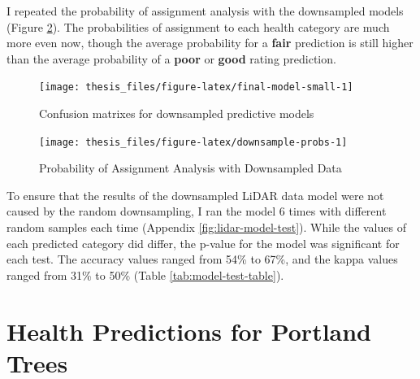 \documentclass[12pt,twoside]{reedthesis}
\begin{document}
I repeated the probability of assignment analysis with the downsampled
models (Figure \ref{fig:downsample-probs}). The probabilities of
assignment to each health category are much more even now, though the
average probability for a \textbf{fair} prediction is still higher than the
average probability of a \textbf{poor} or \textbf{good} rating prediction.
\begin{figure}[H]

{\centering \texttt{[image: thesis\_files/figure-latex/final-model-small-1]} 

}

\caption{Confusion matrixes for downsampled predictive models}\label{fig:final-model-small}
\end{figure}
\begin{figure}[H]

{\centering \texttt{[image: thesis\_files/figure-latex/downsample-probs-1]} 

}

\caption{Probability of Assignment Analysis with Downsampled Data}\label{fig:downsample-probs}
\end{figure}
To ensure that the results of the downsampled LiDAR data model were not
caused by the random downsampling, I ran the model 6 times with
different random samples each time (Appendix
\ref{fig:lidar-model-test}). While the values of each predicted
category did differ, the p-value for the model was significant for each
test. The accuracy values ranged from 54\% to 67\%, and the kappa values
ranged from 31\% to 50\% (Table \ref{tab:model-test-table}).

\hypertarget{health-predictions-for-portland-trees}{%
\section{Health Predictions for Portland Trees}\label{health-predictions-for-portland-trees}}
\end{document}
